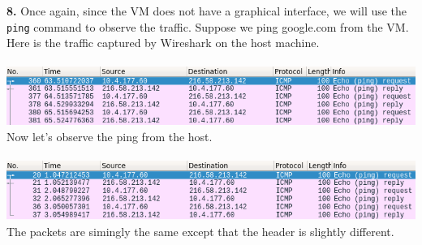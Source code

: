 \documentclass[12pt]{extarticle}
\begin{document}
\textbf{8.} Once again, since the VM does not have a graphical interface, we will use the \texttt{ping} command to observe the traffic. Suppose we ping google.com from the VM. Here is the traffic captured by Wireshark on the host machine.\\~\\
\includegraphics[scale=0.6]{resources/1-8.png}\\
Now let's observe the ping from the host.\\~\\
\includegraphics[scale=0.6]{resources/1-8-1.png}\\
The packets are simingly the same except that the header is slightly different.
\end{document}
